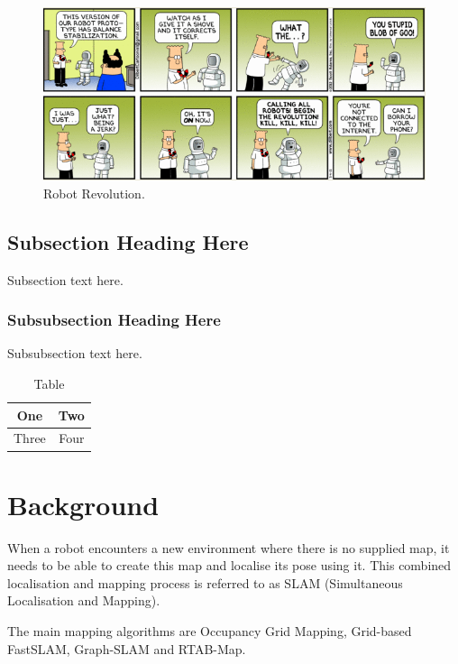 \documentclass[10pt,journal,compsoc]{IEEEtran}
\begin{document}
\begin{figure}[thpb]
      \centering
      \includegraphics[width=\linewidth]{RobotRevolution5}
      \caption{Robot Revolution.}
      \label{fig:robot1}
\end{figure}

\subsection{Subsection Heading Here}
Subsection text here.

\subsubsection{Subsubsection Heading Here}
Subsubsection text here.

\begin{table}[h]
\caption{Table}
\label{table_example}
\begin{center}
\begin{tabular}{|c||c|}
\hline
One & Two\\
\hline
Three & Four\\
\hline
\end{tabular}
\end{center}
\end{table}



\section{Background}
When a robot encounters a new environment where there is no supplied map, it needs to be able to create this map and localise its pose using it. This combined localisation and mapping process is referred to as SLAM (Simultaneous Localisation and Mapping).

The main mapping algorithms are Occupancy Grid Mapping, Grid-based FastSLAM, Graph-SLAM and RTAB-Map.
\end{document}

